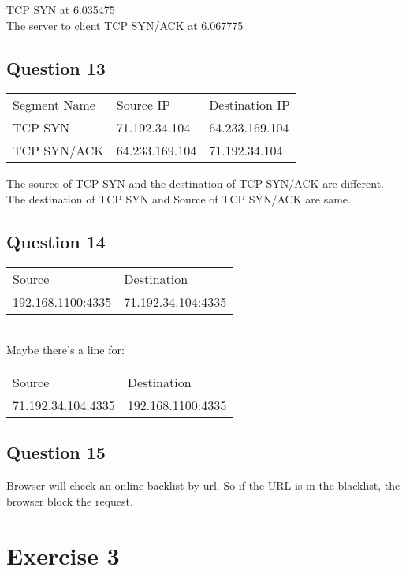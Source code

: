 \documentclass{article}
\begin{document}
TCP SYN at 6.035475 \\
The server to client TCP SYN/ACK at 6.067775

\subsection{Question 13}

\begin{tabular} {l l l}
    Segment Name& Source IP      & Destination IP\\
    TCP SYN     & 71.192.34.104  & 64.233.169.104\\
    TCP SYN/ACK & 64.233.169.104 & 71.192.34.104
\end{tabular}
The source of TCP SYN and the destination of TCP SYN/ACK are different.
The destination of TCP SYN and Source of TCP SYN/ACK are same.

\subsection{Question 14}
\begin{tabular} {l l}
    Source            & Destination\\
    192.168.1100:4335 & 71.192.34.104:4335
\end{tabular}\\
Maybe there's a line for:\\
\begin{tabular}{l l}
    Source            & Destination\\
    71.192.34.104:4335 & 192.168.1100:4335 
\end{tabular}

\subsection{Question 15}

Browser will check an online backlist by url. So if the URL is in the blacklist, the browser block the request.

\section{Exercise 3}
\end{document}
